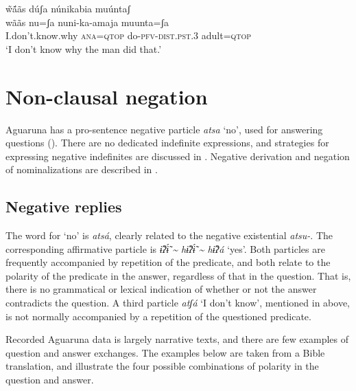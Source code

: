 \documentclass[output=paper,colorlinks,citecolor=brown,draft]{langscibook}
\begin{document}
\ea\label{ex:agu:42}
    \glll w̃ã́ãs dúʃa núnikabia muúntaʃ\\ 
          wããs  nu=ʃa  nuni-ka-amaja  muunta=ʃa \\
          I.don’t.know.why  \textsc{ana=qtop}  do\textsc{{}-pfv-dist.pst.3} adult\textsc{=qtop} \\
    \glt ‘I don’t know why the man did that.’ \citep[401]{Overall2017a}
\z 

\section{Non-clausal negation}\label{sec:agu:3}

Aguaruna has a pro-sentence negative particle \textit{atsa} ‘no’, used for answering questions (). There are no dedicated indefinite expressions, and strategies for expressing negative indefinites are discussed in . Negative derivation and negation of nominalizations are described in .

\subsection{Negative replies}\label{sec:agu:3.1}

The word for ‘no’ is \textit{atsá}, clearly related to the negative existential \textit{atsu-}. The corresponding affirmative particle is \textit{ɨ̃ʔɨ̃́ \textasciitilde{} hɨ̃ʔɨ̃́ \textasciitilde{} hɨ̃ʔá } ‘yes’. Both particles are frequently accompanied by repetition of the predicate, and both relate to the polarity of the predicate in the answer, regardless of that in the question. That is, there is no grammatical or lexical indication of whether or not the answer contradicts the question. A third particle \textit{atʃá} ‘I don’t know’, mentioned in  above, is not normally accompanied by a repetition of the questioned predicate.

Recorded Aguaruna data is largely narrative texts, and there are few examples of question and answer exchanges. The examples below are taken from a Bible translation, and illustrate the four possible combinations of polarity in the question and answer.
\end{document}
